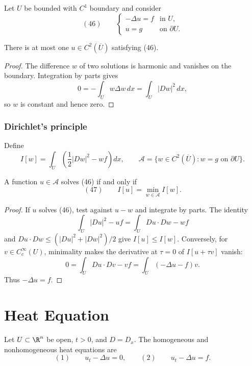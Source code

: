 Let $U$ be bounded with $C^1$ boundary and consider
$$(46)\qquad
\begin{cases}
-\Delta u=f&\text{in }U,\\
u=g&\text{on }\partial U.
\end{cases}$$

\begin{theorem}[Uniqueness]
\label{thm:uniqueness-poisson-energy-method}
\leanok
{}
There is at most one $u\in C^2(\overline U)$ satisfying (46).
\end{theorem}
\begin{proof}
\leanok
\sketch The difference $w$ of two solutions is harmonic and vanishes on the
boundary. Integration by parts gives
$$0=-\int_Uw\Delta w\,dx=\int_U|Dw|^2\,dx,$$
so $w$ is constant and hence zero.
\end{proof}

\subsubsection{Dirichlet's principle}
\label{sec:laplace-dirichlets-principle}

Define
$$I[w]=\int_U\left(\frac12|Dw|^2-wf\right)dx,
\qquad
\mathcal A=\{w\in C^2(\overline U):w=g\text{ on }\partial U\}.$$

\begin{theorem}
\label{thm:dirichlets-principle}
A function $u\in\mathcal A$ solves (46) if and only if
$$(47)\qquad I[u]=\min_{w\in\mathcal A}I[w].$$
\end{theorem}
\begin{proof}
\sketch If $u$ solves (46), test against $u-w$ and integrate by parts. The
identity
$$\int_U|Du|^2-uf=\int_UDu\cdot Dw-wf$$
and $Du\cdot Dw\le(|Du|^2+|Dw|^2)/2$ give $I[u]\le I[w]$. Conversely, for
$v\in C_c^\infty(U)$, minimality makes the derivative at $\tau=0$ of
$I[u+\tau v]$ vanish:
$$0=\int_U Du\cdot Dv-vf=\int_U(-\Delta u-f)v.$$
Thus $-\Delta u=f$.
\end{proof}

\section{Heat Equation}
\label{sec:heat-equation}

Let $U\subset\R^n$ be open, $t>0$, and $D=D_x$. The homogeneous and
nonhomogeneous heat equations are
$$(1)\qquad u_t-\Delta u=0,
\qquad
(2)\qquad u_t-\Delta u=f.$$

